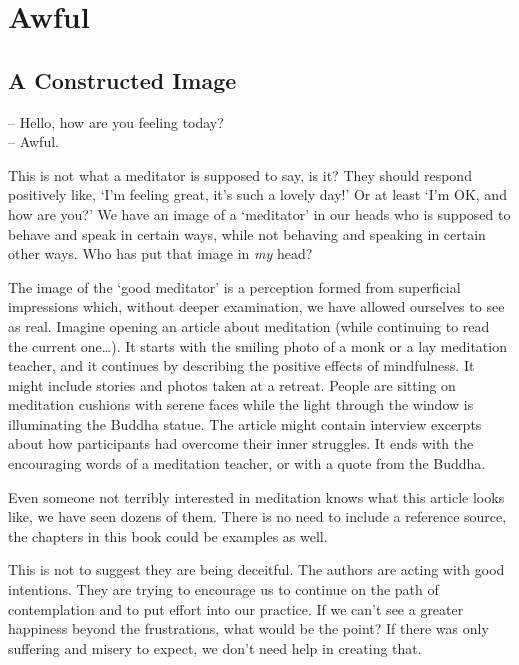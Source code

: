 \chapter{Awful}

\section{A Constructed Image}


\noindent -- Hello, how are you feeling today?\\
-- Awful.

This is not what a meditator is supposed to say, is it? They should
respond positively like, `I'm feeling great, it's such a lovely day!' Or
at least `I'm OK, and how are you?' We have an image of a `meditator' in
our heads who is supposed to behave and speak in certain ways, while not
behaving and speaking in certain other ways. Who has put that image in
\emph{my} head?

The image of the `good meditator' is a perception formed from
superficial impressions which, without deeper examination, we have
allowed ourselves to see as real. Imagine opening an article about
meditation (while continuing to read the current one\ldots). It starts
with the smiling photo of a monk or a lay meditation teacher, and it
continues by describing the positive effects of mindfulness. It might
include stories and photos taken at a retreat. People are sitting on
meditation cushions with serene faces while the light through the window
is illuminating the Buddha statue. The article might contain interview
excerpts about how participants had overcome their inner struggles. It
ends with the encouraging words of a meditation teacher, or with a quote
from the Buddha.

Even someone not terribly interested in meditation knows what this
article looks like, we have seen dozens of them. There is no need to
include a reference source, the chapters in this book could be examples
as well.

This is not to suggest they are being deceitful. The authors are acting
with good intentions. They are trying to encourage us to continue on the
path of contemplation and to put effort into our practice. If we can't
see a greater happiness beyond the frustrations, what would be the
point? If there was only suffering and misery to expect, we don't need
help in creating that.

